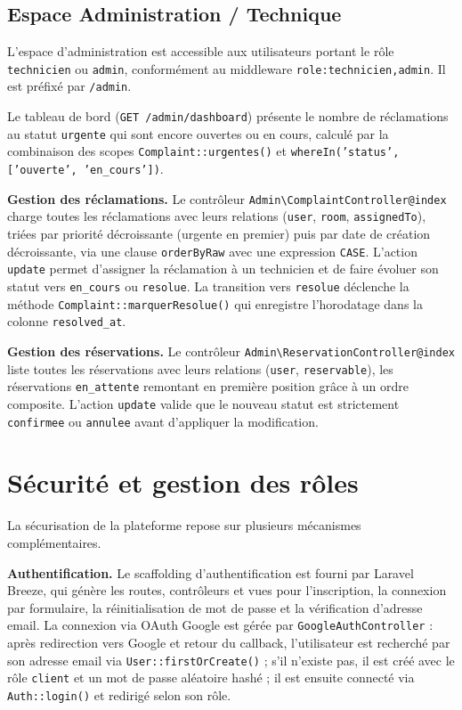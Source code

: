 \documentclass[12pt,a4paper]{report}
\begin{document}
\subsection{Espace Administration / Technique}

L'espace d'administration est accessible aux utilisateurs portant le rôle
\texttt{technicien} ou \texttt{admin}, conformément au middleware
\texttt{role:technicien,admin}. Il est préfixé par \texttt{/admin}.

Le tableau de bord (\texttt{GET /admin/dashboard}) présente le nombre de
réclamations au statut \texttt{urgente} qui sont encore ouvertes ou en
cours, calculé par la combinaison des scopes \texttt{Complaint::urgentes()}
et \texttt{whereIn('status', ['ouverte', 'en\_cours'])}.

\textbf{Gestion des réclamations.} Le contrôleur
\texttt{Admin\textbackslash{}ComplaintController@index} charge toutes les
réclamations avec leurs relations (\texttt{user}, \texttt{room},
\texttt{assignedTo}), triées par priorité décroissante (urgente en premier)
puis par date de création décroissante, via une clause \texttt{orderByRaw}
avec une expression \texttt{CASE}. L'action \texttt{update} permet
d'assigner la réclamation à un technicien et de faire évoluer son statut
vers \texttt{en\_cours} ou \texttt{resolue}. La transition vers
\texttt{resolue} déclenche la méthode \texttt{Complaint::marquerResolue()}
qui enregistre l'horodatage dans la colonne \texttt{resolved\_at}.

\textbf{Gestion des réservations.} Le contrôleur
\texttt{Admin\textbackslash{}ReservationController@index} liste toutes
les réservations avec leurs relations (\texttt{user}, \texttt{reservable}),
les réservations \texttt{en\_attente} remontant en première position grâce
à un ordre composite. L'action \texttt{update} valide que le nouveau statut
est strictement \texttt{confirmee} ou \texttt{annulee} avant d'appliquer
la modification.

\section{Sécurité et gestion des rôles}

La sécurisation de la plateforme repose sur plusieurs mécanismes
complémentaires.

\textbf{Authentification.} Le scaffolding d'authentification est fourni par
Laravel Breeze, qui génère les routes, contrôleurs et vues pour
l'inscription, la connexion par formulaire, la réinitialisation de mot de
passe et la vérification d'adresse email. La connexion via OAuth Google est
gérée par \texttt{GoogleAuthController} : après redirection vers Google et
retour du callback, l'utilisateur est recherché par son adresse email via
\texttt{User::firstOrCreate()} ; s'il n'existe pas, il est créé avec le
rôle \texttt{client} et un mot de passe aléatoire hashé ; il est ensuite
connecté via \texttt{Auth::login()} et redirigé selon son rôle.
\end{document}
